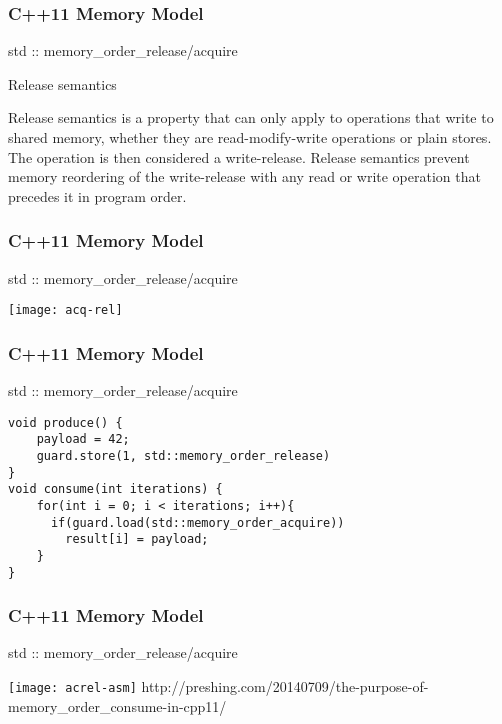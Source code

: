 \begin{frame}
    \frametitle{C++11 Memory Model}
    \LARGE
    std :: memory\_order\_release/acquire
    
    \large
    \begin{block}{Release semantics}
        
Release semantics is a property that can only apply to operations that write to shared memory, whether they are read-modify-write operations or plain stores. The operation is then considered a write-release. Release semantics prevent memory reordering of the write-release with any read or write operation that precedes it in program order.
    \end{block}
\end{frame}


\begin{frame}
    \frametitle{C++11 Memory Model}
    \LARGE
    std :: memory\_order\_release/acquire
    
    \centering
    \texttt{[image: acq-rel]}
\end{frame}


\begin{frame}[fragile]
    \frametitle{C++11 Memory Model}
    \LARGE
    std :: memory\_order\_release/acquire
\normalsize    
\begin{block}{}
    \begin{verbatim}
void produce() {
    payload = 42;
    guard.store(1, std::memory_order_release)
}
void consume(int iterations) {
    for(int i = 0; i < iterations; i++){
      if(guard.load(std::memory_order_acquire))
        result[i] = payload;
    }
}
\end{verbatim}
\end{block}

\end{frame}


\begin{frame}
    \frametitle{C++11 Memory Model}
    \LARGE
    std :: memory\_order\_release/acquire
    
    
    \texttt{[image: acrel-asm]}
    \tiny
    http://preshing.com/20140709/the-purpose-of-memory\_order\_consume-in-cpp11/
    
\end{frame}

